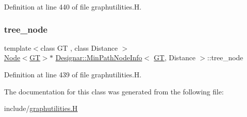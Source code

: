 Definition at line 440 of file graphutilities.\+H.

\mbox{\label{class_designar_1_1_min_path_node_info_a0121695ed8523a60ee92375767a5c169}} 
\subsubsection{\texorpdfstring{tree\+\_\+node}{tree\_node}}
{\footnotesize\ttfamily template$<$class GT , class Distance $>$ \\
\hyperlink{namespace_designar_a5af326c65aa2bd26b26c410f2030d09e}{Node}$<$\hyperlink{demo-buildgraph_8_c_a3001c40d2c31ca87ed96cd7d1334a55e}{GT}$>$$\ast$ \hyperlink{class_designar_1_1_min_path_node_info}{Designar\+::\+Min\+Path\+Node\+Info}$<$ \hyperlink{demo-buildgraph_8_c_a3001c40d2c31ca87ed96cd7d1334a55e}{GT}, Distance $>$\+::tree\+\_\+node}



Definition at line 439 of file graphutilities.\+H.



The documentation for this class was generated from the following file\+:\begin{DoxyCompactItemize}
\item 
include/\hyperlink{graphutilities_8_h}{graphutilities.\+H}\end{DoxyCompactItemize}
